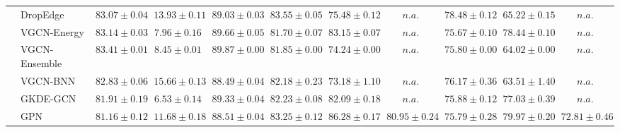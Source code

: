 \begin{table*}[!h]
{\begin{tabular}{ll|cc|cccc|ccc}
        & DropEdge & ${83.07\scriptscriptstyle \pm 0.04}$ & ${13.93\scriptscriptstyle \pm 0.11}$ & ${89.03\scriptscriptstyle \pm 0.03}$ & ${83.55\scriptscriptstyle \pm 0.05}$ & ${75.48\scriptscriptstyle \pm 0.12}$ & $n.a.$ & ${78.48\scriptscriptstyle \pm 0.12}$ & ${65.22\scriptscriptstyle \pm 0.15}$ & $n.a.$\\
        & VGCN-Energy & ${83.14\scriptscriptstyle \pm 0.03}$ & ${7.96\scriptscriptstyle \pm 0.16}$ & ${89.66\scriptscriptstyle \pm 0.05}$ & ${81.70\scriptscriptstyle \pm 0.07}$ & ${83.15\scriptscriptstyle \pm 0.07}$ & $n.a.$ & ${75.67\scriptscriptstyle \pm 0.10}$ & ${78.44\scriptscriptstyle \pm 0.10}$ & $n.a.$\\
        & VGCN-Ensemble & ${83.41\scriptscriptstyle \pm 0.01}$ & ${8.45\scriptscriptstyle \pm 0.01}$ & ${89.87\scriptscriptstyle \pm 0.00}$ & ${81.85\scriptscriptstyle \pm 0.00}$ & ${74.24\scriptscriptstyle \pm 0.00}$ & $n.a.$ & ${75.80\scriptscriptstyle \pm 0.00}$ & ${64.02\scriptscriptstyle \pm 0.00}$ & $n.a.$\\
        & VGCN-BNN & ${82.83\scriptscriptstyle \pm 0.06}$ & ${15.66\scriptscriptstyle \pm 0.13}$ & ${88.49\scriptscriptstyle \pm 0.04}$ & ${82.18\scriptscriptstyle \pm 0.23}$ & ${73.18\scriptscriptstyle \pm 1.10}$ & $n.a.$ & ${76.17\scriptscriptstyle \pm 0.36}$ & ${63.51\scriptscriptstyle \pm 1.40}$ & $n.a.$\\
        & GKDE-GCN & ${81.91\scriptscriptstyle \pm 0.19}$ & ${\mathbf{6.53}\scriptscriptstyle \pm 0.14}$ & ${89.33\scriptscriptstyle \pm 0.04}$ & ${82.23\scriptscriptstyle \pm 0.08}$ & ${82.09\scriptscriptstyle \pm 0.18}$ & $n.a.$ & ${75.88\scriptscriptstyle \pm 0.12}$ & ${77.03\scriptscriptstyle \pm 0.39}$ & $n.a.$\\
        & GPN & ${81.16\scriptscriptstyle \pm 0.12}$ & ${11.68\scriptscriptstyle \pm 0.18}$ & ${88.51\scriptscriptstyle \pm 0.04}$ & ${83.25\scriptscriptstyle \pm 0.12}$ & ${\mathbf{86.28}\scriptscriptstyle \pm 0.17}$ & ${{80.95}\scriptscriptstyle \pm 0.24}$ & ${75.79\scriptscriptstyle \pm 0.28}$ & ${\mathbf{79.97}\scriptscriptstyle \pm 0.20}$ & ${{72.81}\scriptscriptstyle \pm 0.46}$\\


\end{tabular}}
\end{table*}
